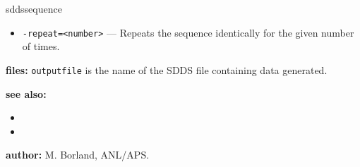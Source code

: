 \begin{sddsprog}{sddssequence}
\begin{itemize}
      \item \verb|-repeat=<number>| --- Repeats the sequence identically for the given number of times.
    \end{itemize}
  \item \textbf{files:} \verb|outputfile| is the name of the SDDS file containing data generated.
  \item \textbf{see also:}
    \begin{itemize}
      \item {}
      \item {}
    \end{itemize}
  \item \textbf{author:} M. Borland, ANL/APS.
\end{sddsprog}
